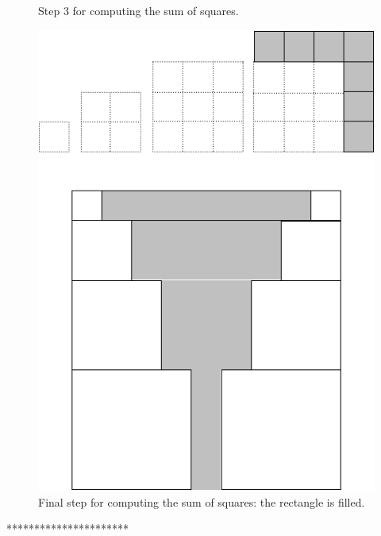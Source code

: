 {\begin{figure}[ht]
\begin{center}
\caption{Step 3 for computing the sum of squares.}
       \label{fig:sumSquares4}
\end{center}
\end{figure}
\begin{figure}[ht]
\begin{center}
       \includegraphics[scale=0.4]{FiguresMaths/SumSquares5}
\caption{Final step for computing the sum of squares: the rectangle is filled.}
       \label{fig:sumSquares5}
\end{center}
\end{figure}
**********************}

